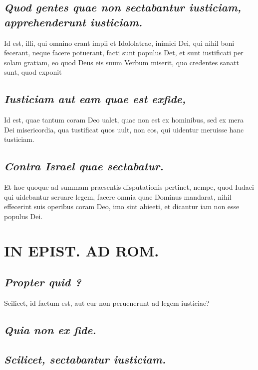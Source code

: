 \documentclass{article}
\begin{document}
\begin{pages}
\subsection*{\textit{Quod gentes quae non sectabantur iusticiam, apprehenderunt iusticiam. }}\pstart Id est, illi, qui omnino erant impii et Idololatrae, inimici Dei, qui nihil boni fecerant, neque facere potuerant, facti sunt populus Det, et sunt iustificati per solam gratiam, eo quod Deus eis suum Verbum miserit, quo credentes sanatt sunt, quod exponit  \pend
{}
{}
\subsection*{\textit{Iusticiam aut eam quae est exfide, }}\pstart Id est, quae tantum coram Deo ualet, quae non est ex hominibus, sed ex mera Dei misericordia, qua tustificat quos uult, non eos, qui uidentur meruisse hanc tusticiam.   \pend
{}
{}
\subsection*{\textit{Contra Israel quae sectabatur. }}\pstart Et hoc quoque ad summam praesentis disputationis pertinet, nempe, quod Iudaei qui uidebantur seruare legem, facere omnia quae Dominus mandarat, nihil effecerint suis operibus coram Deo, imo sint abieeti, et dicantur iam non esse populus Dei.   \pend
\section*{IN EPIST. AD ROM.  }
\marginpar{[ p.116 ]}
{}
\subsection*{\textit{Propter quid ? }}\pstart Scilicet, id factum est, aut cur non peruenerunt ad legem iusticiae?  \pend
{}
{}
\subsection*{\textit{Quia non ex fide. }}
{}
\subsection*{\textit{Scilicet, sectabantur iusticiam.  }}
{}

\end{pages}
\end{document}
